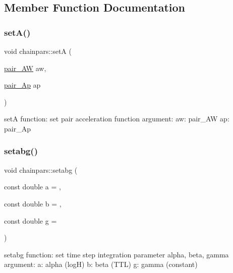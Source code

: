 \subsection{Member Function Documentation}
\hypertarget{classchainpars_a4ff03f287a4200ae41c61bb340111a9b}{}\label{classchainpars_a4ff03f287a4200ae41c61bb340111a9b} 
\subsubsection{\texorpdfstring{set\+A()}{setA()}}
{\footnotesize\ttfamily void chainpars\+::setA (\begin{DoxyParamCaption}\item[{\hyperlink{AR_8h_a0b1ff9eb7f37c90dc26918b4ec3a829d}{pair\+\_\+\+AW}}]{aw,  }\item[{\hyperlink{AR_8h_a9ba933d6e3fcd6363bc2e7eb341e1f5d}{pair\+\_\+\+Ap}}]{ap }\end{DoxyParamCaption})\hspace{0.3cm}{\ttfamily [inline]}}



setA function\+: set pair acceleration function argument\+: aw\+: pair\+\_\+\+AW ap\+: pair\+\_\+\+Ap 

\hypertarget{classchainpars_af0e28b16eb33ca55032972fca9f7e660}{}\label{classchainpars_af0e28b16eb33ca55032972fca9f7e660} 
\subsubsection{\texorpdfstring{setabg()}{setabg()}}
{\footnotesize\ttfamily void chainpars\+::setabg (\begin{DoxyParamCaption}\item[{const double}]{a = {},  }\item[{const double}]{b = {},  }\item[{const double}]{g = {} }\end{DoxyParamCaption})\hspace{0.3cm}{\ttfamily [inline]}}



setabg function\+: set time step integration parameter alpha, beta, gamma argument\+: a\+: alpha (logH) b\+: beta (T\+TL) g\+: gamma (constant) 

\hypertarget{classchainpars_a04954a52ce40d1efd400ccc694dda2a1}{}\label{classchainpars_a04954a52ce40d1efd400ccc694dda2a1} 
